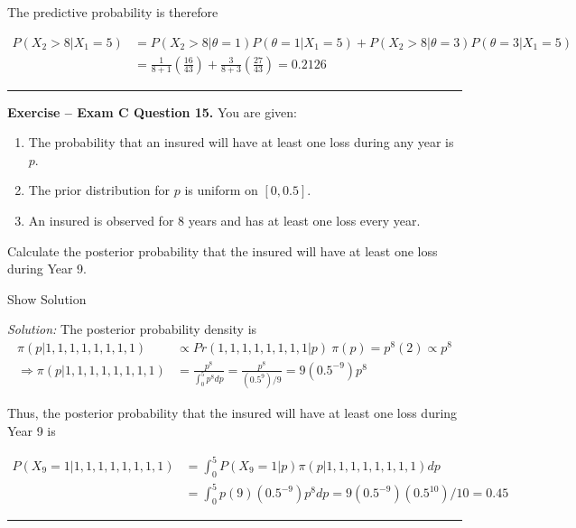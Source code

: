 \documentclass[]{book}
\providecommand{\tightlist}{%
  \setlength{\itemsep}{0pt}\setlength{\parskip}{0pt}}
\theoremstyle{definition}
\theoremstyle{definition}
\theoremstyle{definition}
\theoremstyle{remark}
\begin{document}
The predictive probability is therefore

\[\begin{aligned}
P(X_2>8|X_1=5) &= P(X_2>8|\theta=1) P(\theta=1|X_1=5) + P(X_2>8|\theta=3) P(\theta=3 | X_1=5) \\
&= \frac{1}{8+1}\left( \frac{16}{43}\right) + \frac{3}{8+3} \left( \frac{27}{43}\right) = 0.2126
\end{aligned}\]

\begin{center}\rule{0.5\linewidth}{\linethickness}\end{center}

\textbf{Exercise -- Exam C Question 15.} You are given:

\begin{enumerate}
\def\labelenumi{(\roman{enumi})}
\tightlist
\item
  The probability that an insured will have at least one loss during any
  year is \(p\).
\item
  The prior distribution for \(p\) is uniform on \([0, 0.5]\).
\item
  An insured is observed for 8 years and has at least one loss every
  year.
\end{enumerate}

Calculate the posterior probability that the insured will have at least
one loss during Year 9.

Show Solution

\hypertarget{toggleExamC15}{}
\emph{Solution:} The posterior probability density is \[\begin{aligned}
\pi(p|1,1,1,1,1,1,1,1) &\propto Pr(1,1,1,1,1,1,1,1|p)\ \pi(p) = p^8(2) \propto p^8 \\ 
\Rightarrow \pi(p|1,1,1,1,1,1,1,1) &= \frac{p^8}{\int_0^5 p^8 dp} = \frac{p^8}{(0.5^9)/9} = 9(0.5^{-9})p^8
\end{aligned}\]

Thus, the posterior probability that the insured will have at least one
loss during Year 9 is

\[\begin{aligned}
P(X_9=1|1,1,1,1,1,1,1,1) &= \int_0^5 P(X_9=1|p) \pi(p|1,1,1,1,1,1,1,1) dp \\
&= \int_0^5 p(9)(0.5^{-9})p^8 dp = 9(0.5^{-9})(0.5^{10})/10 = 0.45
\end{aligned}\]

\begin{center}\rule{0.5\linewidth}{\linethickness}\end{center}
\end{document}
